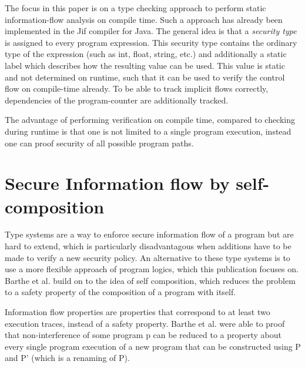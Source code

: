 \documentclass[a4paper,UKenglish]{lipics-v2018}
\begin{document}
The focus in this paper is on a type checking approach to perform static information-flow analysis on compile time. Such a approach has already been implemented in the Jif compiler for Java.\cite{JFlow} The general idea is that a \textit{security type} is assigned to every program expression. This security type contains the ordinary type of the expression (such as int, float, string, etc.) and additionally a static label which describes how the resulting value can be used. This value is static and not determined on runtime, such that it can be used to verify the control flow on compile-time already.\cite{language_based_information_flow_security}
To be able to track implicit flows correctly, dependencies of the program-counter are additionally tracked.

The advantage of performing verification on compile time, compared to checking during runtime is that one is not limited to a single program execution, instead one can proof security of all possible program paths.\cite{language_based_information_flow_security}




\newpage
\section{Secure Information flow by self-composition}

Type systems are a way to enforce secure information flow of a program but are hard to extend, which is particularly disadvantagous when additions have to be made to verify a new security policy. An alternative to these type systems is to use a more flexible approach of program logics, which this publication focuses on. Barthe et al. build on to the idea of self composition, which reduces the problem to a safety property of the composition of a program with itself.\cite{information_flow_by_self_composition}

Information flow properties are properties that correspond to at least two execution traces, instead of a safety property. Barthe et al. were able to proof that non-interference of some program p can be reduced to a property about every single program execution of a new program that can be constructed using P and P' (which is a renaming of P).\cite{information_flow_by_self_composition}
\end{document}
